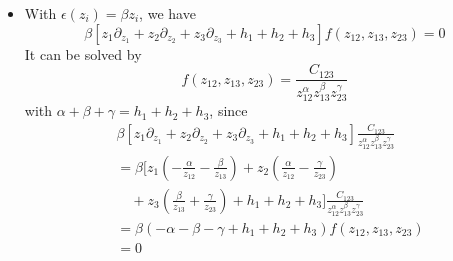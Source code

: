 \begin{enumerate}
\begin{itemize}
		\item With  $\epsilon(z_i) = \beta z_i$, we have
			\begin{equation*}
				\beta \left[ z_1 \partial_{z_1} + z_2 \partial_{z_2} + z_3 \partial_{z_3} + h_1 + h_2 + h_3 \right] f(z_{12}, z_{13}, z_{23}) = 0
			\end{equation*}
			It can be solved by
			\begin{equation*}
				f(z_{12}, z_{13}, z_{23}) = \frac{C_{123}}{z_{12}^\alpha z_{13}^\beta z_{23}^\gamma}
			\end{equation*}
			with $\alpha + \beta + \gamma = h_1 + h_2 + h_3$, since
			\begin{align*}
				&\beta \left[ z_1 \partial_{z_1} + z_2 \partial_{z_2} + z_3 \partial_{z_3} + h_1 + h_2 + h_3 \right] \frac{C_{123}}{z_{12}^\alpha z_{13}^\beta z_{23}^\gamma} \\
				&=\beta \Bigg[ z_1 \left( - \frac{\alpha}{z_{12}} - \frac{\beta }{z_{13}} \right) + z_2 \left( \frac{\alpha}{z_{12}} - \frac{\gamma}{z_{23}} \right) \\
				&\quad + z_3 \left( \frac{\beta}{z_{13}} + \frac{\gamma}{z_{23}} \right) + h_1 + h_2 + h_3 \Bigg] \frac{C_{123}}{z_{12}^\alpha z_{13}^\beta z_{23}^\gamma} \\
				&= \beta \left( -\alpha -\beta - \gamma + h_1 + h_2 + h_3 \right) f(z_{12}, z_{13}, z_{23})  \\
				& = 0
			\end{align*}


\end{itemize}
\end{enumerate}
